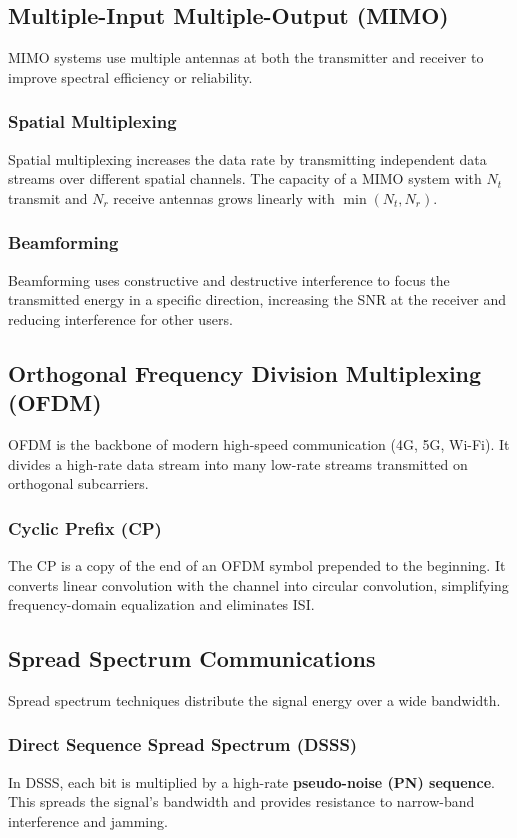 
\subsection{Multiple-Input Multiple-Output (MIMO)}
MIMO systems use multiple antennas at both the transmitter and receiver to improve spectral efficiency or reliability.

\subsubsection{Spatial Multiplexing}
Spatial multiplexing increases the data rate by transmitting independent data streams over different spatial channels. The capacity of a MIMO system with $N_t$ transmit and $N_r$ receive antennas grows linearly with $\min(N_t, N_r)$.

\subsubsection{Beamforming}
Beamforming uses constructive and destructive interference to focus the transmitted energy in a specific direction, increasing the SNR at the receiver and reducing interference for other users.

\subsection{Orthogonal Frequency Division Multiplexing (OFDM)}
OFDM is the backbone of modern high-speed communication (4G, 5G, Wi-Fi). It divides a high-rate data stream into many low-rate streams transmitted on orthogonal subcarriers.

\subsubsection{Cyclic Prefix (CP)}
The CP is a copy of the end of an OFDM symbol prepended to the beginning. It converts linear convolution with the channel into circular convolution, simplifying frequency-domain equalization and eliminates ISI.

\subsection{Spread Spectrum Communications}
Spread spectrum techniques distribute the signal energy over a wide bandwidth.

\subsubsection{Direct Sequence Spread Spectrum (DSSS)}
In DSSS, each bit is multiplied by a high-rate \textbf{pseudo-noise (PN) sequence}. This spreads the signal's bandwidth and provides resistance to narrow-band interference and jamming.

